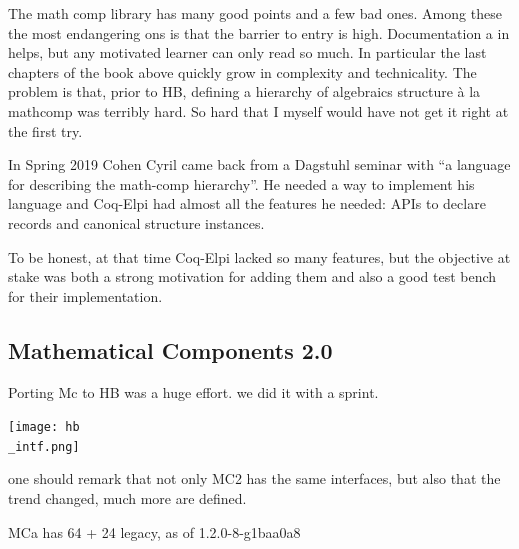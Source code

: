 \documentclass[a4paper, 11pt]{book}
\begin{document}
The math comp library has many good points and a few bad ones. Among these
the most endangering ons is that the barrier to entry is high. Documentation
a in \cite{assia_mahboubi_2022_7118596} helps, but any motivated learner
can only read so much. In particular the last chapters of the book above
quickly grow in complexity and technicality. The problem is that, prior to
HB, defining a hierarchy of algebraics structure à la mathcomp was terribly
hard. So hard that I myself would have not get it right at the first try.

In Spring 2019 Cohen Cyril came back from a Dagstuhl seminar with ``a language for
describing the math-comp hierarchy''. He needed a way to implement his language and
Coq-Elpi had almost all the features he needed: APIs to declare records and
canonical structure instances.

To be honest, at that time Coq-Elpi lacked so many features, but the objective
at stake was both a strong motivation for adding them and also a good test
bench for their implementation.



\cite{cohen_et_al:LIPIcs.FSCD.2020.34}

\subsection{Mathematical Components 2.0}

Porting Mc to HB was a huge effort. we did it with a sprint.

\cite{affeldt:hal-03463762}

\texttt{[image: hb\\\_intf.png]}

one should remark that not only MC2 has the same interfaces, but
also that the trend changed, much more are defined.

MCa has 64 + 24 legacy, as of 1.2.0-8-g1baa0a8



\end{document}
